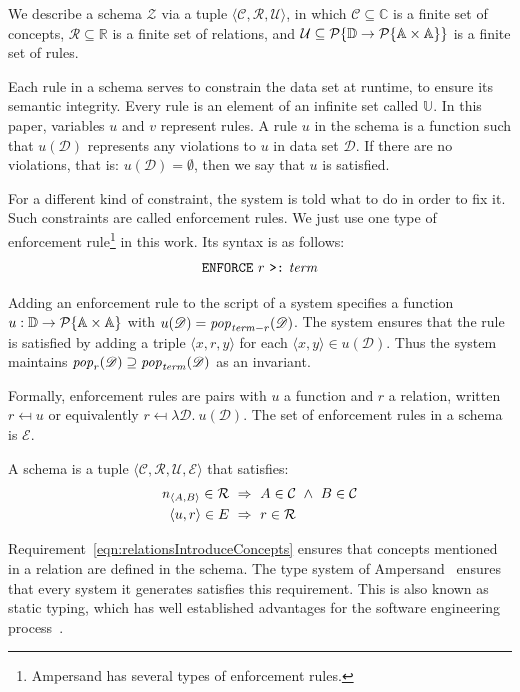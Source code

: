 \documentclass[runningheads]{llncs}
\newcommand{\id}[1]{\text{\it #1\/}}
\newcommand{\popF}[1]{\id{pop}_{#1}}
\newcommand{\pop}[2]{\popF{#1}(#2)}
\newcommand{\viol}[2]{{#1}(#2)}
\newcommand{\powerset}[1]{\cal{P}\{#1\}}
\newcommand{\declare}[3]{\id{#1}_{\pair{#2}{#3}}}
\newcommand{\pair}[2]{\langle{#1},{#2}\rangle}
\newcommand{\Pair}[2]{#1\times#2}
\newcommand{\triple}[3]{\langle{#1},{#2},{#3}\rangle}
\newcommand{\quadruple}[4]{\langle{#1},{#2},{#3},{#4}\rangle}
\newcommand{\Atoms}{\mathbb{A}}
\newcommand{\concepts}{\mathcal{C}}
\newcommand{\Concepts}{\mathbb{C}}
\newcommand{\rels}{\mathcal{R}}   %
\newcommand{\Rels}{\mathbb{R}}   %
\newcommand{\enforces}{\mathcal{E}}
\newcommand{\rules}{\mathcal{U}}
\newcommand{\Rules}{\mathbb{U}}
\newcommand{\dataset}{\mathscr{D}}
\newcommand{\Dataset}{\mathbb{D}}
\newcommand{\schema}{\mathscr{Z}}
\begin{document}
   We describe a schema $\schema$ via a tuple $\triple{\concepts}{\rels}{\rules}$,
   in which $\concepts\subseteq \Concepts$ is a finite set of concepts,
   $\rels\subseteq \Rels$ is a finite set of relations,
   and $\rules\subseteq \powerset{\Dataset \to \powerset{\Pair{\Atoms}{\Atoms}}}$ is a finite set of rules.
   
   Each rule in a schema serves to constrain the data set at runtime, to ensure its semantic integrity.
   Every rule is an element of an infinite set called $\Rules$.
   In this paper, variables $u$ and $v$ represent rules.
   A rule $u$ in the schema is a function such that $\viol{u}{\dataset}$ represents any violations to $u$ in data set $\dataset$.
   If there are no violations, that is: $\viol{u}{\dataset} = \emptyset{}$, then we say that $u$ is satisfied.
   
   For a different kind of constraint, the system is told what to do in order to fix it.
   Such constraints are called enforcement rules.
   We just use one type of enforcement rule\footnote{Ampersand has several types of enforcement rules.} in this work.
   Its syntax is as follows:
\begin{align}
      \text{\tt ENFORCE}\ r\ \text{\tt >:}\ \id{term}\label{enforce ins}
\end{align}

   Adding an enforcement rule to the script of a system specifies a function $u : \Dataset \to \powerset{\Pair{\Atoms}{\Atoms}}$
   with $\viol{u}{\dataset} = \pop{\id{term} - r}{\dataset}$.
   The system ensures that the rule is satisfied by adding a triple $\triple{x}{r}{y}$ for each $\pair{x}{y} \in \viol{u}{\dataset}$.
   Thus the system maintains $\pop{r}{\dataset} \supseteq \pop{\id{term}}{\dataset}$ as an invariant.
   
   Formally, enforcement rules are pairs with $u$ a function and $r$ a relation, written $r \mapsfrom u$ or equivalently $r \mapsfrom \lambda \dataset.~ u(\dataset)$.
   The set of enforcement rules in a schema is $\enforces$.
   
   \begin{definition}[Schema]
   A schema is a tuple $\quadruple{\concepts}{\rels}{\rules}{\enforces}$ that satisfies:
\begin{align}
   \declare{n}{A}{B}\in\rels&~\Rightarrow~ A\in\concepts\ \wedge\ B\in\concepts
   \label{eqn:relationsIntroduceConcepts}\\
   \pair{u}{r}\in\mathcal\enforces&~\Rightarrow~ r \in \rels\label{eqn:enforceRulesRels}
\end{align}
   \end{definition}
   Requirement~\ref{eqn:relationsIntroduceConcepts} ensures that concepts mentioned in a relation are defined in the schema.
   The type system of Ampersand~\cite{vdWoude2011} ensures that every system it generates satisfies this requirement.
   This is also known as static typing, which has well established advantages for the software engineering process~\cite{HanenbergKRTS14,Petersen2014}.
   
\end{document}
